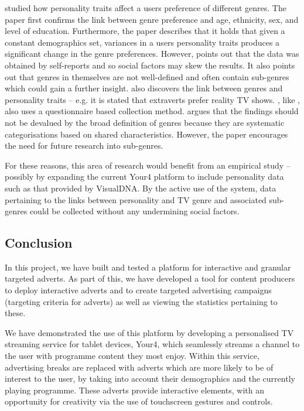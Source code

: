 	\citet{rentfrow2010listening} studied how personality traits affect a users preference of different genres. The paper first confirms the link between genre preference and age, ethnicity, sex, and level of education. Furthermore, the paper describes that it holds that given a constant demographics set, variances in a users personality traits produces a significant change in the genre preferences. However, \citeauthor{rentfrow2010listening} points out that the data was obtained by self-reports and so social factors may skew the results. It also points out that genres in themselves are not well-defined and often contain sub-genres which could gain a further insight. \citet{shim2007effects} also discovers the link between genres and personality traits -- e.g. it is stated that extraverts prefer reality TV shows. \citeauthor{shim2007effects}, like \citeauthor{rentfrow2010listening}, also uses a questionnaire based collection method. \citeauthor{shim2007effects} argues that the findings should not be devalued by the broad definition of genres because they are systematic categorisations based on shared characteristics. However, the paper encourages the need for future research into sub-genres.

	For these reasons, this area of research would benefit from an empirical study -- possibly by expanding the current Your4 platform to include personality data such as that provided by VisualDNA. By the active use of the system, data pertaining to the links between personality and TV genre and associated sub-genres could be collected without any undermining social factors.

\subsection{Conclusion}

In this project, we have built and tested a platform for interactive and granular targeted adverts. As part of this, we have developed a tool for content producers to deploy interactive adverts and to create targeted advertising campaigns (targeting criteria for adverts) as well as viewing the statistics pertaining to these.

We have demonstrated the use of this platform by developing a personalised TV streaming service for tablet devices, Your4, which seamlessly streams a channel to the user with programme content they most enjoy. Within this service, advertising breaks are replaced with adverts which are more likely to be of interest to the user, by taking into account their demographics and the currently playing programme. These adverts provide interactive elements, with an opportunity for creativity via the use of touchscreen gestures and controls.

